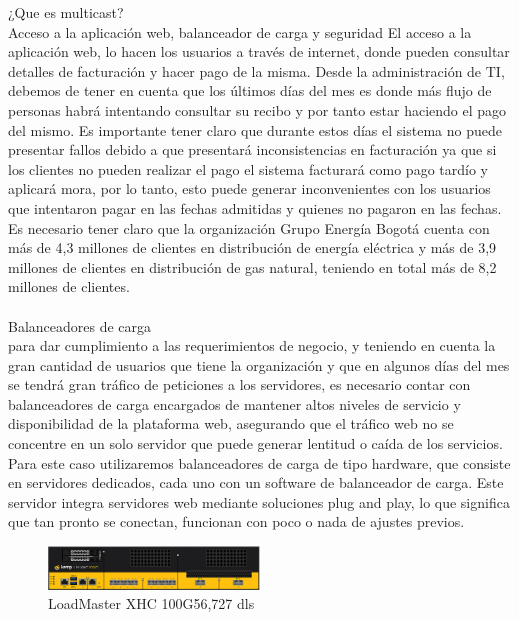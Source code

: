 ¿Que es multicast? \\
Acceso a la aplicación web, balanceador de carga y seguridad
El acceso a la aplicación web, lo hacen los usuarios a través de internet, donde pueden consultar detalles de facturación y hacer pago de la misma. 
Desde la administración de TI, debemos de tener en cuenta que los últimos días del mes es donde más flujo de personas habrá intentando consultar su recibo 
y por tanto estar haciendo el pago del mismo. Es importante tener claro que durante estos días el sistema no puede presentar fallos debido a que presentará inconsistencias 
en facturación ya que si los clientes no pueden realizar el pago el sistema facturará como pago tardío y aplicará mora, por lo tanto, 
esto puede generar inconvenientes con los usuarios que intentaron pagar en las fechas admitidas y quienes no pagaron en las fechas. 
Es necesario tener claro que la organización Grupo Energía Bogotá cuenta con más de 4,3 millones de clientes 
en distribución de energía eléctrica y más de 3,9 millones de clientes en distribución de gas natural, teniendo en total más de 8,2 millones de clientes.
\\ 
\\
Balanceadores de carga\\
para dar cumplimiento a las requerimientos de negocio, y teniendo en cuenta la gran cantidad de usuarios que tiene la organización y que en algunos días del mes 
se tendrá gran tráfico de peticiones a los servidores, es necesario contar con balanceadores de carga encargados de mantener altos niveles de servicio y disponibilidad 
de la plataforma web, asegurando que el tráfico web no se concentre en un solo servidor que puede generar lentitud o caída de los servicios.
Para este caso utilizaremos balanceadores de carga de tipo hardware, que consiste en servidores dedicados, cada uno con un software de balanceador de carga. 
Este servidor integra servidores web mediante soluciones plug and play, lo que significa que tan pronto se conectan, funcionan con poco o nada de ajustes previos.\\
\begin{figure}[htb]
    \centering
    \includegraphics[width=0.5\textwidth]{assets/ld1.png}
    \caption{LoadMaster XHC 100G56,727 dls}
    \label{fig:modelo}
    \end{figure}
    \label{sec:Background} \\

